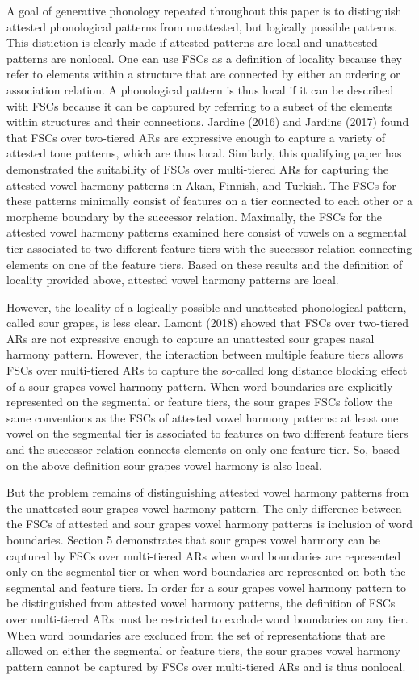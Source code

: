 \documentclass[,doc,floatsintext]{apa6}
\theoremstyle{definition}
\theoremstyle{definition}
\theoremstyle{definition}
\theoremstyle{remark}
\begin{document}
A goal of generative phonology repeated throughout this paper is to
distinguish attested phonological patterns from unattested, but
logically possible patterns. This distiction is clearly made if attested
patterns are local and unattested patterns are nonlocal. One can use
FSCs as a definition of locality because they refer to elements within a
structure that are connected by either an ordering or association
relation. A phonological pattern is thus local if it can be described
with FSCs because it can be captured by referring to a subset of the
elements within structures and their connections. Jardine (2016) and
Jardine (2017) found that FSCs over two-tiered ARs are expressive enough
to capture a variety of attested tone patterns, which are thus local.
Similarly, this qualifying paper has demonstrated the suitability of
FSCs over multi-tiered ARs for capturing the attested vowel harmony
patterns in Akan, Finnish, and Turkish. The FSCs for these patterns
minimally consist of features on a tier connected to each other or a
morpheme boundary by the successor relation. Maximally, the FSCs for the
attested vowel harmony patterns examined here consist of vowels on a
segmental tier associated to two different feature tiers with the
successor relation connecting elements on one of the feature tiers.
Based on these results and the definition of locality provided above,
attested vowel harmony patterns are local.

However, the locality of a logically possible and unattested
phonological pattern, called sour grapes, is less clear. Lamont (2018)
showed that FSCs over two-tiered ARs are not expressive enough to
capture an unattested sour grapes nasal harmony pattern. However, the
interaction between multiple feature tiers allows FSCs over multi-tiered
ARs to capture the so-called long distance blocking effect of a sour
grapes vowel harmony pattern. When word boundaries are explicitly
represented on the segmental or feature tiers, the sour grapes FSCs
follow the same conventions as the FSCs of attested vowel harmony
patterns: at least one vowel on the segmental tier is associated to
features on two different feature tiers and the successor relation
connects elements on only one feature tier. So, based on the above
definition sour grapes vowel harmony is also local.

But the problem remains of distinguishing attested vowel harmony
patterns from the unattested sour grapes vowel harmony pattern. The only
difference between the FSCs of attested and sour grapes vowel harmony
patterns is inclusion of word boundaries. Section 5 demonstrates that
sour grapes vowel harmony can be captured by FSCs over multi-tiered ARs
when word boundaries are represented only on the segmental tier or when
word boundaries are represented on both the segmental and feature tiers.
In order for a sour grapes vowel harmony pattern to be distinguished
from attested vowel harmony patterns, the definition of FSCs over
multi-tiered ARs must be restricted to exclude word boundaries on any
tier. When word boundaries are excluded from the set of representations
that are allowed on either the segmental or feature tiers, the sour
grapes vowel harmony pattern cannot be captured by FSCs over
multi-tiered ARs and is thus nonlocal.
\end{document}
